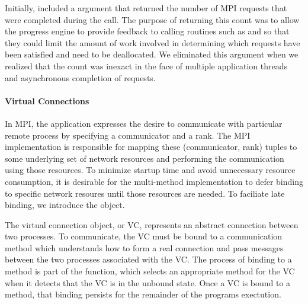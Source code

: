\begin{discussion}
Initially,  included a  argument that returned the
number of MPI requests that were completed during the call.  The purpose of
returning this count was to allow the progress engine to provide feedback to
calling routines such as  and  so that they could
limit the amount of work involved in determining which requests have been
satisfied and need to be deallocated.  We eliminated this argument when we
realized that the count was inexact in the face of multiple application threads
and asynchronous completion of requests.
\end{discussion}


\paragraph{Virtual Connections}

% 
% 

In MPI, the application expresses the desire to communicate with particular
remote process by specifying a communicator and a rank.  The MPI implementation
is responsible for mapping these (communicator, rank) tuples to some underlying
set of network resources and performing the communication using those
resources.  To minimize startup time and avoid unnecessary resource
consumption, it is desirable for the multi-method implementation to defer
binding to specific network resoures until those resources are needed.  To
faciliate late binding, we introduce the  object.

The virtual connection object, or VC, represents an abstract connection between
two processes.  To communicate, the VC must be bound to a communication method
which understands how to form a real connection and pass messages between the
two processes associated with the VC.  The process of binding to a method is
part of the  function, which selects an
appropriate method for the VC when it detects that the VC is in the unbound
state.  Once a VC is bound to a method, that binding persists for the remainder
of the programs exectution.

